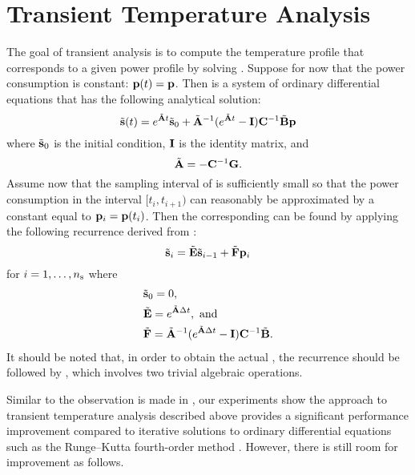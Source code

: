 \section{Transient Temperature Analysis}

The goal of transient analysis is to compute the temperature profile \mq that
corresponds to a given power profile \mp by solving
. Suppose for now that the power consumption is
constant: $\mathbf{p}(t) = \mathbf{p}$. Then  is a
system of ordinary differential equations that has the following analytical
solution:
\begin{equation} \elab{solution-original}
  \tvs(t) = e^{\tm{A} t} \tvs_0 + \tm{A}^{-1} (e^{\tm{A} t} - \m{I}) \m{C}^{-1} \tm{B} \vp
\end{equation}
where $\tilde{\mathbf{s}}_0$ is the initial condition, $\mathbf{I}$ is the identity matrix, and
\[
  \tilde{\mathbf{A}} = -\mathbf{C}^{-1} \mathbf{G}.
\]
Assume now that the sampling interval \dt of \mp is sufficiently small so that
the power consumption in the interval $[t_i, t_{i + 1})$ can reasonably be
approximated by a constant equal to $\mathbf{p}_i = \mathbf{p}(t_i)$. Then the corresponding
\mq can be found by applying the following recurrence derived from
:
\begin{equation} \elab{recurrence-original}
  \tvs_{i} = \tm{E} \tvs_{i - 1} + \tm{F} \vp_i
\end{equation}
for $i = 1, \dots, {n_\mathrm{s}}$ where
\begin{align*}
  & \tilde{\mathbf{s}}_0 = 0, \\
  & \tilde{\mathbf{E}} = e^{\tilde{\mathbf{A}} \Delta t}, \text{ and} \\
  & \tilde{\mathbf{F}} = \tilde{\mathbf{A}}^{-1}(e^{\tilde{\mathbf{A}} \Delta t} - \mathbf{I})\mathbf{C}^{-1} \tilde{\mathbf{B}}.
\end{align*}
It should be noted that, in order to obtain the actual \mq, the recurrence
should be followed by , which involves two
trivial algebraic operations.

Similar to the observation is made in \cite{thiele2011}, our experiments show
the approach to transient temperature analysis described above provides a
significant performance improvement compared to iterative solutions to ordinary
differential equations such as the Runge--Kutta fourth-order method
\cite{press2007}. However, there is still room for improvement as follows.

